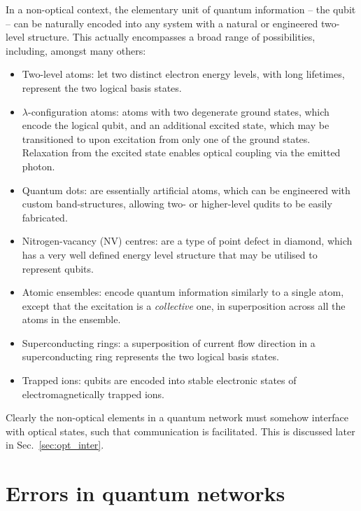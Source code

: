 \documentclass[aps, rmp, twocolumn, amsmath, amssymb, nofootinbib, superscriptaddress, longbibliography, floatfix, table-of-contents, eqsecnum]{revtex4-1}
\begin{document}
In a non-optical context, the elementary unit of quantum information -- the qubit -- can be naturally encoded into any system with a natural or engineered two-level structure. This actually encompasses a broad range of possibilities, including, amongst many others:
\begin{itemize}
\item {}Two-level atoms: let two distinct electron energy levels, with long lifetimes, represent the two logical basis states.
\item {}$\lambda$-configuration atoms: atoms with two degenerate ground states, which encode the logical qubit, and an additional excited state, which may be transitioned to upon excitation from only one of the ground states. Relaxation from the excited state enables optical coupling via the emitted photon.
\item {}Quantum dots: are essentially artificial atoms, which can be engineered with custom band-structures, allowing two- or higher-level qudits to be easily fabricated.
\item {}Nitrogen-vacancy (NV) centres: are a type of point defect in diamond, which has a very well defined energy level structure that may be utilised to represent qubits.
\item {}Atomic ensembles: encode quantum information similarly to a single atom, except that the excitation is a \textit{collective} one, in superposition across all the atoms in the ensemble.
\item {}Superconducting rings: a superposition of current flow direction in a superconducting ring represents the two logical basis states.
\item {}Trapped ions: qubits are encoded into stable electronic states of electromagnetically trapped ions.
\end{itemize}

Clearly the non-optical elements in a quantum network must somehow interface with optical states, such that communication is facilitated. This is discussed later in Sec.~\ref{sec:opt_inter}.

%
%

\section{Errors in quantum networks} \label{sec:errors_in_nets} 
\end{document}
